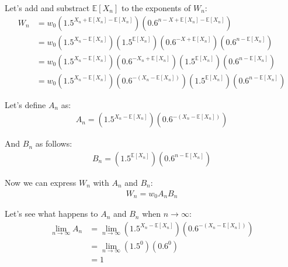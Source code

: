 \documentclass[12pt]{article}
\begin{document}
Let's add and substract $\mathbb{E}[X_n]$ to the exponents of $W_n$:
\begin{equation*}
  \begin{split}
      W_n &= w_0 \left(1.5^{X_n + \mathbb{E}[X_n] - \mathbb{E}[X_n]}\right) \left(0.6^{n - X + \mathbb{E}[X_n] - \mathbb{E}[X_n]}\right)\\
    &= w_0 \left(1.5^{X_n - \mathbb{E}[X_n]}\right) \left(1.5^{\mathbb{E}[X_n]}\right) \left(0.6^{- X + \mathbb{E}[X_n]}\right) \left(0.6^{n - \mathbb{E}[X_n]}\right)\\
    & = w_0 \left(1.5^{X_n - \mathbb{E}[X_n]}\right) \left(0.6^{- X_n + \mathbb{E}[X_n]}\right) \left(1.5^{\mathbb{E}[X_n]}\right) \left(0.6^{n - \mathbb{E}[X_n]}\right)\\
    & = w_0 \left(1.5^{X_n - \mathbb{E}[X_n]}\right) \left(0.6^{- (X_n - \mathbb{E}[X_n])}\right) \left(1.5^{\mathbb{E}[X_n]}\right) \left(0.6^{n - \mathbb{E}[X_n]}\right)
  \end{split}
\end{equation*}

Let's define $A_n$ as:
\begin{align}
  \begin{equation*}
    A_n = \left(1.5^{X_n - \mathbb{E}[X_n]}\right) \left(0.6^{-(X_n - \mathbb{E}[X_n])}\right)
  \end{equation*}
\end{align}

And $B_n$ as follows:
\begin{align}
  \begin{equation*}
    B_n = \left(1.5^{\mathbb{E}[X_n]}\right) \left(0.6^{n - \mathbb{E}[X_n]}\right)
  \end{equation*}
\end{align}

Now we can express $W_n$ with $A_n$ and $B_n$:
\begin{align}
  \begin{equation*}
    W_n = w_0 A_n  B_n
  \end{equation*}
\end{align}

Let's see what happens to $A_n$ and $B_n$ when $n \rightarrow \infty$:
\begin{equation*}
  \begin{split}
    \lim_{n\to\infty} A_n &= \lim_{n\to\infty} \left(1.5^{X_n - \mathbb{E}[X_n]}\right) \left(0.6^{-(X_n - \mathbb{E}[X_n])}\right)\\
    &= \lim_{n\to\infty} \left(1.5^0\right) \left(0.6^0\right)\\
    & = 1
  \end{split}
\end{equation*}
\end{document}
